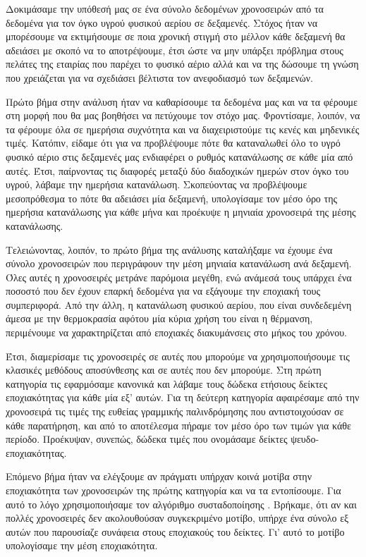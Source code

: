 Δοκιμάσαμε την υπόθεσή μας σε ένα σύνολο δεδομένων χρονοσειρών από τα δεδομένα για τον όγκο υγρού φυσικού αερίου σε δεξαμενές. Στόχος ήταν να μπορέσουμε να εκτιμήσουμε σε ποια χρονική στιγμή στο μέλλον κάθε δεξαμενή θα αδειάσει με σκοπό να το αποτρέψουμε, έτσι ώστε να μην υπάρξει πρόβλημα στους πελάτες της εταιρίας που παρέχει το φυσικό αέριο αλλά και να της δώσουμε τη γνώση που χρειάζεται για να σχεδιάσει βέλτιστα τον ανεφοδιασμό των δεξαμενών.

Πρώτο βήμα στην ανάλυση ήταν να καθαρίσουμε τα δεδομένα μας και να τα φέρουμε στη μορφή που θα μας βοηθήσει να πετύχουμε τον στόχο μας. Φροντίσαμε, λοιπόν, να τα φέρουμε όλα σε ημερήσια συχνότητα και να διαχειριστούμε τις κενές και μηδενικές τιμές. Κατόπιν, είδαμε ότι για να προβλέψουμε πότε θα καταναλωθεί όλο το υγρό φυσικό αέριο στις δεξαμενές μας ενδιαφέρει ο ρυθμός κατανάλωσης σε κάθε μία από αυτές. Έτσι, παίρνοντας τις διαφορές μεταξύ δύο διαδοχικών ημερών στον όγκο του υγρού, λάβαμε την ημερήσια κατανάλωση. Σκοπεύοντας να προβλέψουμε μεσοπρόθεσμα το πότε θα αδειάσει μία δεξαμενή, υπολογίσαμε τον μέσο όρο της ημερήσια κατανάλωσης για κάθε μήνα και προέκυψε η μηνιαία χρονοσειρά της μέσης κατανάλωσης. 

Τελειώνοντας, λοιπόν, το πρώτο βήμα της ανάλυσης καταλήξαμε να έχουμε ένα σύνολο χρονοσειρών που περιγράφουν την μέση μηνιαία κατανάλωση ανά δεξαμενή. Όλες αυτές η χρονοσειρές μετράνε παρόμοια μεγέθη, ενώ ανάμεσά τους υπάρχει ένα ποσοστό που δεν έχουν επαρκή δεδομένα για να εξάγουμε την εποχιακή τους συμπεριφορά. Από την άλλη, η κατανάλωση φυσικού αερίου, που είναι συνδεδεμένη άμεσα με την θερμοκρασία αφότου μία κύρια χρήση του είναι η θέρμανση, περιμένουμε να χαρακτηρίζεται από εποχιακές διακυμάνσεις στο μήκος του χρόνου. 

Έτσι, διαμερίσαμε τις χρονοσειρές σε αυτές που μπορούμε να χρησιμοποιήσουμε τις κλασικές μεθόδους αποσύνθεσης και σε αυτές που δεν μπορούμε. Στη πρώτη κατηγορία τις εφαρμόσαμε κανονικά και λάβαμε τους δώδεκα ετήσιους δείκτες εποχιακότητας για κάθε μία εξ' αυτών. Για τη δεύτερη κατηγορία αφαιρέσαμε από την χρονοσειρά τις τιμές της ευθείας γραμμικής παλινδρόμησης που αντιστοιχούσαν σε κάθε παρατήρηση, και από το αποτέλεσμα πήραμε τον μέσο όρο των τιμών για κάθε περίοδο. Προέκυψαν, συνεπώς, δώδεκα τιμές που ονομάσαμε δείκτες ψευδο-εποχιακότητας.

Επόμενο βήμα ήταν να ελέγξουμε αν πράγματι υπήρχαν κοινά μοτίβα στην εποχιακότητα των χρονοσειρών της πρώτης κατηγορία και να τα εντοπίσουμε. Για αυτό το λόγο χρησιμοποιήσαμε τον αλγόριθμο συσταδοποίησης . Βρήκαμε, ότι αν και πολλές χρονοσειρές δεν ακολουθούσαν συγκεκριμένο μοτίβο, υπήρχε ένα σύνολο εξ αυτών που παρουσίαζε συνάφεια στους εποχιακούς του δείκτες. Γι' αυτό το μοτίβο υπολογίσαμε την μέση εποχιακότητα.

